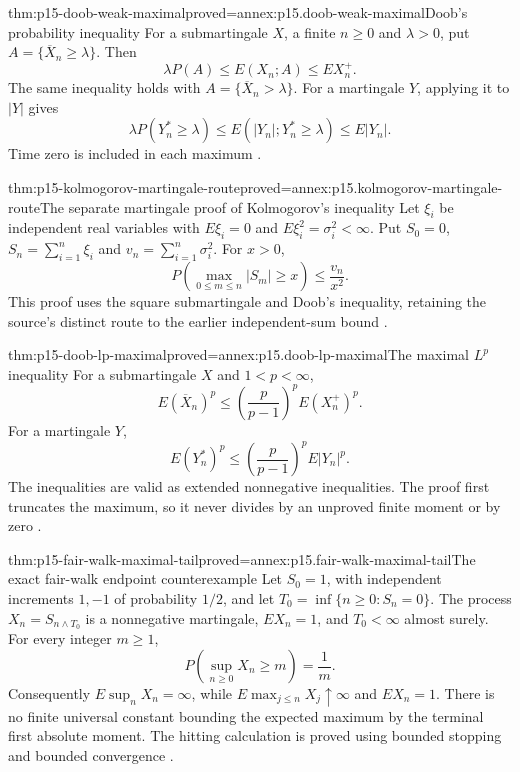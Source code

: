 \begin{hbtheorem}{thm:p15-doob-weak-maximal}{proved=annex:p15.doob-weak-maximal}{Doob's probability inequality}
For a submartingale \(X\), a finite \(n\geq0\) and \(\lambda>0\), put
\(A=\{\overline X_n\geq\lambda\}\). Then
\[
                         \lambda P(A)\leq E(X_n;A)\leq EX_n^+.
\]
The same inequality holds with \(A=\{\overline X_n>\lambda\}\).
For a martingale \(Y\), applying it to \(|Y|\) gives
\[
                  \lambda P(Y_n^*\geq\lambda)
                         \leq E(|Y_n|;Y_n^*\geq\lambda)
                         \leq E|Y_n|.
\]
Time zero is included in each maximum
\cite[thm.~4.4.2]{DurrettPTEAuthor2019}.
\end{hbtheorem}

\begin{hbtheorem}{thm:p15-kolmogorov-martingale-route}{proved=annex:p15.kolmogorov-martingale-route}{The separate martingale proof of Kolmogorov's inequality}
Let \(\xi_i\) be independent real variables with
\(E\xi_i=0\) and \(E\xi_i^2=\sigma_i^2<\infty\).
Put \(S_0=0\), \(S_n=\sum_{i=1}^n\xi_i\) and
\(v_n=\sum_{i=1}^n\sigma_i^2\). For \(x>0\),
\[
               P\left(\max_{0\leq m\leq n}|S_m|\geq x\right)
                                      \leq\frac{v_n}{x^2}.
\]
This proof uses the square submartingale and Doob's inequality,
retaining the source's distinct route to the earlier independent-sum
bound \cite[ex.~4.4.3]{DurrettPTEAuthor2019}.
\end{hbtheorem}

\begin{hbtheorem}{thm:p15-doob-lp-maximal}{proved=annex:p15.doob-lp-maximal}{The maximal \(L^p\) inequality}
For a submartingale \(X\) and \(1<p<\infty\),
\[
                 E(\overline X_n)^p
                    \leq\left(\frac p{p-1}\right)^pE(X_n^+)^p.
\]
For a martingale \(Y\),
\[
                 E(Y_n^*)^p
                    \leq\left(\frac p{p-1}\right)^pE|Y_n|^p.
\]
The inequalities are valid as extended nonnegative inequalities.
The proof first truncates the maximum, so it never divides by an
unproved finite moment or by zero
\cite[thm.~4.4.4]{DurrettPTEAuthor2019}.
\end{hbtheorem}

\begin{hbtheorem}{thm:p15-fair-walk-maximal-tail}{proved=annex:p15.fair-walk-maximal-tail}{The exact fair-walk endpoint counterexample}
Let \(S_0=1\), with independent increments \(1,-1\) of probability
\(1/2\), and let \(T_0=\inf\{n\geq0:S_n=0\}\).
The process \(X_n=S_{n\wedge T_0}\) is a nonnegative martingale,
\(EX_n=1\), and \(T_0<\infty\) almost surely. For every integer \(m\geq1\),
\[
                 P\left(\sup_{n\geq0}X_n\geq m\right)=\frac1m.
\]
Consequently \(E\sup_nX_n=\infty\), while
\(E\max_{j\leq n}X_j\uparrow\infty\) and \(EX_n=1\).
There is no finite universal constant bounding the expected maximum
by the terminal first absolute moment. The hitting calculation is
proved using bounded stopping and bounded convergence
\cite[ex.~4.4.5]{DurrettPTEAuthor2019}.
\end{hbtheorem}

